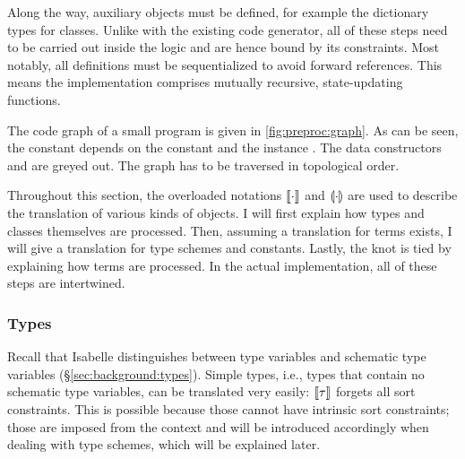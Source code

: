 
\noindent
Along the way, auxiliary objects must be defined, for example the dictionary types for classes.
Unlike with the existing code generator, all of these steps need to be carried out inside the logic and are hence bound by its constraints.
Most notably, all definitions must be sequentialized to avoid forward references.
This means the implementation comprises mutually recursive, state-updating functions.

The code graph of a small program is given in \cref{fig:preproc:graph}.
As can be seen, the constant  depends on the constant  and the instance .
The data constructors  and  are greyed out.
The graph has to be traversed in topological order.


\noindent
Throughout this section, the overloaded notations $\llbracket\cdot\rrbracket$ and $\llparenthesis\cdot\rrparenthesis$ are used to describe the translation of various kinds of objects.
I will first explain how types and classes themselves are processed.
Then, assuming a translation for terms exists, I will give a translation for type schemes and constants.
Lastly, the knot is tied by explaining how terms are processed.
In the actual implementation, all of these steps are intertwined.

\subsubsection{Types}

Recall that Isabelle distinguishes between type variables and schematic type variables (§\ref{sec:background:types}).
Simple types, i.e., types that contain no schematic type variables, can be translated very easily: $\llbracket\tau\rrbracket$ forgets all sort constraints.
This is possible because those cannot have intrinsic sort constraints; those are imposed from the context and will be introduced accordingly when dealing with type schemes, which will be explained later.

